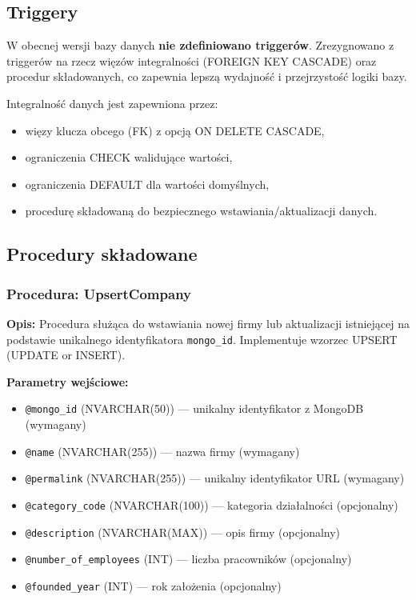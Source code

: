 \documentclass[12pt,a4paper]{article}
\begin{document}
\subsection{Triggery}

W obecnej wersji bazy danych \textbf{nie zdefiniowano triggerów}. Zrezygnowano z triggerów na rzecz więzów integralności (FOREIGN KEY CASCADE) oraz procedur składowanych, co zapewnia lepszą wydajność i przejrzystość logiki bazy.

Integralność danych jest zapewniona przez:
\begin{itemize}[noitemsep]
    \item więzy klucza obcego (FK) z opcją ON DELETE CASCADE,
    \item ograniczenia CHECK walidujące wartości,
    \item ograniczenia DEFAULT dla wartości domyślnych,
    \item procedurę składowaną do bezpiecznego wstawiania/aktualizacji danych.
\end{itemize}

\newpage
\subsection{Procedury składowane}

\subsubsection{Procedura: UpsertCompany}

\textbf{Opis:} Procedura służąca do wstawiania nowej firmy lub aktualizacji istniejącej na podstawie unikalnego identyfikatora \texttt{mongo\_id}. Implementuje wzorzec UPSERT (UPDATE or INSERT).

\textbf{Parametry wejściowe:}
\begin{itemize}[noitemsep]
    \item \texttt{@mongo\_id} (NVARCHAR(50)) --- unikalny identyfikator z MongoDB (wymagany)
    \item \texttt{@name} (NVARCHAR(255)) --- nazwa firmy (wymagany)
    \item \texttt{@permalink} (NVARCHAR(255)) --- unikalny identyfikator URL (wymagany)
    \item \texttt{@category\_code} (NVARCHAR(100)) --- kategoria działalności (opcjonalny)
    \item \texttt{@description} (NVARCHAR(MAX)) --- opis firmy (opcjonalny)
    \item \texttt{@number\_of\_employees} (INT) --- liczba pracowników (opcjonalny)
    \item \texttt{@founded\_year} (INT) --- rok założenia (opcjonalny)
\end{itemize}
\end{document}
